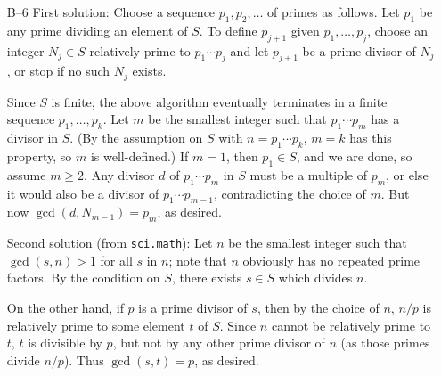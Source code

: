 \documentclass[amssymb,twocolumn,pra,10pt,aps]{revtex4-1}
\begin{document}
\begin{itemize}
\item[B--6]
First solution:
Choose a sequence $p_1, p_2, \dots$ of primes as follows. Let $p_1$ be any prime
dividing an element of $S$. To define $p_{j+1}$ given $p_1, \dots, p_j$,
choose an integer $N_j \in S$ relatively prime to $p_1 \cdots p_j$ and let
$p_{j+1}$ be a prime divisor of $N_j$, or stop if no such $N_j$ exists.

Since $S$ is finite, the above algorithm eventually terminates in a finite
sequence $p_1, \dots, p_k$.
Let $m$ be the smallest integer such that $p_1 \cdots p_m$ has a divisor in $S$.
(By the assumption on $S$ with $n=p_1\cdots p_k$,
$m=k$ has this property, so $m$ is well-defined.)
If $m=1$, then $p_1\in S$, and we are done, so assume $m\geq 2$.
Any divisor $d$ of $p_1\cdots p_m$ in $S$ must be a multiple of $p_m$, or else
it would also be a divisor of $p_1 \cdots p_{m-1}$, contradicting the choice
of $m$. But now $\gcd(d, N_{m-1}) = p_m$, as desired.

Second solution (from \texttt{sci.math}):
Let $n$ be the smallest integer such that $\gcd(s,n) > 1$ for all $s$ in
$n$; note that $n$ obviously has no repeated prime factors.
By the condition on $S$, there exists $s \in S$ which divides $n$.

On the other hand, if $p$ is a prime divisor of $s$, then by the choice
of $n$, $n/p$ is relatively prime to some element $t$ of $S$. Since $n$ cannot
be relatively prime to $t$, $t$ is divisible by $p$, but not by any other
prime divisor of $n$ (as those primes divide $n/p$). Thus $\gcd(s,t) = p$,
as desired.

\end{itemize}
\end{document}
